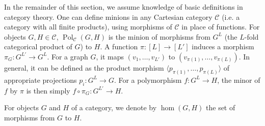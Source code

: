 \documentclass[11pt,a4paper]{scrartcl}
\numberwithin{theorem}{section}
\theoremstyle{definition}
\newcommand{\Cc}{\mathcal{C}}
\DeclareMathOperator{\Pol}{Pol}
\begin{document}
In the remainder of this section, we assume knowledge of basic definitions in category theory.
One can define minions in any Cartesian category $\Cc$ (i.e. a category with all finite products), using morphisms of $\Cc$ in place of functions.
For objects $G,H \in \Cc$, $\Pol_{\Cc}(G,H)$ is the minion of morphisms from $G^L$ (the $L$-fold categorical product of $G$) to $H$.
A function $\pi\colon [L] \to [L']$ induces a morphism $\pi_G \colon G^{L'} \to G^L$.
For a graph $G$, it maps $(v_1,\dots,v_{L'})$ to $(v_{\pi(1)},\dots,v_{\pi(L)})$.
In general, it can be defined as the product morphism $\langle p_{\pi(1)},\dots,p_{\pi(L)} \rangle$ of appropriate projections $p_i \colon G^L \to G$.
For a polymorphism $f \colon G^L \to H$, the minor of $f$ by $\pi$ is then simply $f \circ \pi_G \colon G^{L'} \to H$.

For objects $G$ and $H$ of a category, we denote by $\hom(G,H)$ the set of morphisms from $G$ to $H$.
\end{document}
